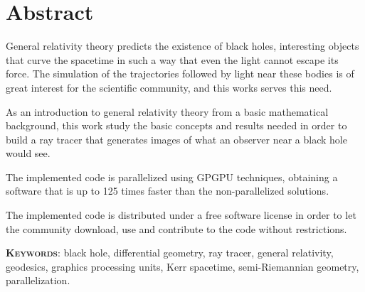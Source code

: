 \begingroup
\let\clearpage\relax
\let\cleardoublepage\relax
\let\cleardoublepage\relax

\chapter*{Abstract}
General relativity theory predicts the existence of black holes, interesting objects that curve the spacetime in such a way that even the light cannot escape its force. The simulation of the trajectories followed by light near these bodies is of great interest for the scientific community, and this works serves this need.

As an introduction to general relativity theory from a basic mathematical background, this work study the basic concepts and results needed in order to build a ray tracer that generates images of what an observer near a black hole would see.

The implemented code is parallelized using \ac{GPGPU} techniques, obtaining a software that is up to 125 times faster than the non-parallelized solutions.

The implemented code is distributed under a free software license in order to let the community download, use and contribute to the code without restrictions.

\vfill

\endgroup

\vfill

\textsc{\textbf{Keywords}}: black hole, differential geometry, ray tracer, general relativity, geodesics, graphics processing units, Kerr spacetime, semi-Riemannian geometry, parallelization.
